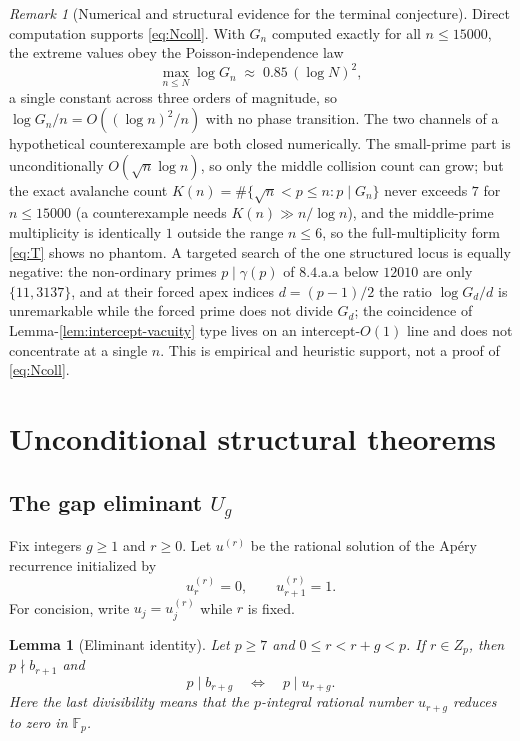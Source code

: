 \documentclass[11pt]{amsart}
\theoremstyle{plain}
\newtheorem{lemma}{Lemma}
\theoremstyle{remark}
\newtheorem{remark}{Remark}
\begin{document}
\begin{remark}[Numerical and structural evidence for the terminal conjecture]
\label{rem:evidence}
Direct computation supports \eqref{eq:Ncoll}.  With $G_n$ computed
exactly for all $n\leq 15000$, the extreme values obey the
Poisson-independence law
\[
 \max_{n\leq N}\log G_n\;\approx\;0.85\,(\log N)^2,
\]
a single constant across three orders of magnitude, so
$\log G_n/n=O((\log n)^2/n)$ with no phase transition.  The two channels
of a hypothetical counterexample are both closed numerically.  The
small-prime part is unconditionally $O(\sqrt n\log n)$, so only the
middle collision count can grow; but the exact avalanche count
$K(n)=\#\{\sqrt n<p\leq n:p\mid G_n\}$ never exceeds $7$ for $n\leq15000$
(a counterexample needs $K(n)\gg n/\log n$), and the middle-prime
multiplicity is identically $1$ outside the range $n\leq 6$, so the
full-multiplicity form \eqref{eq:T} shows no phantom.  A targeted search
of the one structured locus is equally negative: the non-ordinary primes
$p\mid\gamma(p)$ of $8.4.\mathrm{a}.\mathrm{a}$ below $12010$ are only
$\{11,3137\}$, and at their forced apex indices $d=(p-1)/2$ the ratio
$\log G_d/d$ is unremarkable while the forced prime does not divide
$G_d$; the coincidence of Lemma-\ref{lem:intercept-vacuity} type lives on
an intercept-$O(1)$ line and does not concentrate at a single $n$.  This
is empirical and heuristic support, not a proof of \eqref{eq:Ncoll}.
\end{remark}

\section{Unconditional structural theorems}\label{sec:structure}

\subsection{The gap eliminant $U_g$}\label{sec:gap-eliminant}

Fix integers $g\geq1$ and $r\geq0$.  Let $u^{(r)}$ be the rational
solution of the Ap\'ery recurrence initialized by
\[
 u^{(r)}_r=0,
 \qquad
 u^{(r)}_{r+1}=1.
\]
For concision, write $u_j=u^{(r)}_j$ while $r$ is fixed.

\begin{lemma}[Eliminant identity]\label{lem:eliminant-identity}
Let $p\geq7$ and $0\leq r<r+g<p$.  If $r\in Z_p$, then
$p\nmid b_{r+1}$ and
\[
 p\mid b_{r+g}
 \quad\Longleftrightarrow\quad
 p\mid u_{r+g}.
\]
Here the last divisibility means that the $p$-integral rational number
$u_{r+g}$ reduces to zero in $\mathbb F_p$.
\end{lemma}
\end{document}
